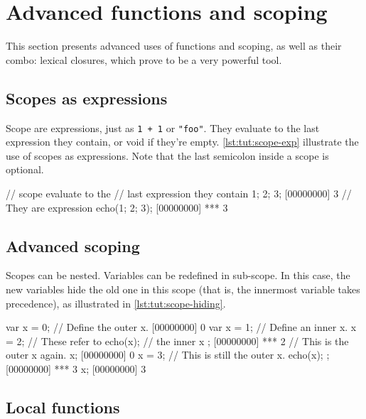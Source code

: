 
\chapter{Advanced functions and scoping}

This section presents advanced uses of functions and scoping, as well
as their combo: lexical closures, which prove to be a very powerful
tool.

\section{Scopes as expressions}

Scope are expressions, just as \lstinline|1 + 1| or \lstinline|"foo"|.
They evaluate to the last expression they contain, or void if they're
empty. \autoref{lst:tut:scope-exp} illustrate the use of scopes as
expressions. Note that the last semicolon inside a scope is optional.

\begin{urbiscript}[caption=Using scope as expressions,label=lst:tut:scope-exp]
// scope evaluate to the
// last expression they contain
{ 1; 2; 3};
[00000000] 3
// They are expression
echo({1; 2; 3});
[00000000] *** 3
\end{urbiscript}

\section{Advanced scoping}

Scopes can be nested. Variables can be redefined in sub-scope. In this
case, the new variables hide the old one in this scope (that is, the
innermost variable takes precedence), as illustrated in
\autoref{lst:tut:scope-hiding}.

\begin{urbiscript}[caption=Redefining variables in
  subscopes,label=lst:tut:scope-hiding]
var x = 0; // Define the outer x.
[00000000] 0
{
  var x = 1; // Define an inner x.
  x = 2;     // These refer to
  echo(x);   // the inner x
};
[00000000] *** 2
// This is the outer x again.
x;
[00000000] 0
{
  x = 3; // This is still the outer x.
  echo(x);
};
[00000000] *** 3
x;
[00000000] 3
\end{urbiscript}

\section{Local functions}

